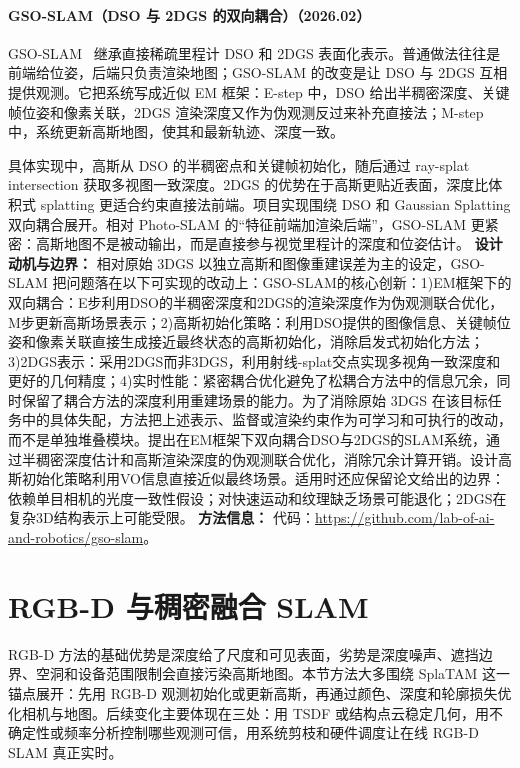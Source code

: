 \paragraph{GSO-SLAM（DSO 与 2DGS 的双向耦合）（2026.02）}
GSO-SLAM~\cite{2602_11714} 继承直接稀疏里程计 DSO 和 2DGS 表面化表示。普通做法往往是前端给位姿，后端只负责渲染地图；GSO-SLAM 的改变是让 DSO 与 2DGS 互相提供观测。它把系统写成近似 EM 框架：E-step 中，DSO 给出半稠密深度、关键帧位姿和像素关联，2DGS 渲染深度又作为伪观测反过来补充直接法；M-step 中，系统更新高斯地图，使其和最新轨迹、深度一致。

具体实现中，高斯从 DSO 的半稠密点和关键帧初始化，随后通过 ray-splat intersection 获取多视图一致深度。2DGS 的优势在于高斯更贴近表面，深度比体积式 splatting 更适合约束直接法前端。项目实现围绕 DSO 和 Gaussian Splatting 双向耦合展开。相对 Photo-SLAM 的“特征前端加渲染后端”，GSO-SLAM 更紧密：高斯地图不是被动输出，而是直接参与视觉里程计的深度和位姿估计。
\textbf{设计动机与边界：} 相对原始 3DGS 以独立高斯和图像重建误差为主的设定，GSO-SLAM 把问题落在以下可实现的改动上：GSO-SLAM的核心创新：1)EM框架下的双向耦合：E步利用DSO的半稠密深度和2DGS的渲染深度作为伪观测联合优化，M步更新高斯场景表示；2)高斯初始化策略：利用DSO提供的图像信息、关键帧位姿和像素关联直接生成接近最终状态的高斯初始化，消除启发式初始化方法；3)2DGS表示：采用2DGS而非3DGS，利用射线-splat交点实现多视角一致深度和更好的几何精度；4)实时性能：紧密耦合优化避免了松耦合方法中的信息冗余，同时保留了耦合方法的深度利用重建场景的能力。为了消除原始 3DGS 在该目标任务中的具体失配，方法把上述表示、监督或渲染约束作为可学习和可执行的改动，而不是单独堆叠模块。提出在EM框架下双向耦合DSO与2DGS的SLAM系统，通过半稠密深度估计和高斯渲染深度的伪观测联合优化，消除冗余计算开销。设计高斯初始化策略利用VO信息直接近似最终场景。适用时还应保留论文给出的边界：依赖单目相机的光度一致性假设；对快速运动和纹理缺乏场景可能退化；2DGS在复杂3D结构表示上可能受限。
\textbf{方法信息：} 代码：\url{https://github.com/lab-of-ai-and-robotics/gso-slam}。



\section{RGB-D 与稠密融合 SLAM}

RGB-D 方法的基础优势是深度给了尺度和可见表面，劣势是深度噪声、遮挡边界、空洞和设备范围限制会直接污染高斯地图。本节方法大多围绕 SplaTAM 这一锚点展开：先用 RGB-D 观测初始化或更新高斯，再通过颜色、深度和轮廓损失优化相机与地图。后续变化主要体现在三处：用 TSDF 或结构点云稳定几何，用不确定性或频率分析控制哪些观测可信，用系统剪枝和硬件调度让在线 RGB-D SLAM 真正实时。


